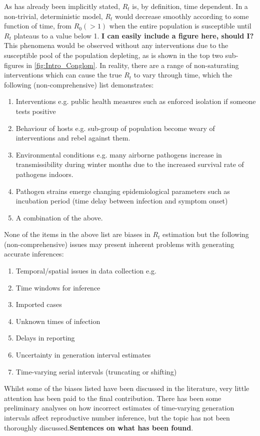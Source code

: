 \documentclass[10pt,journal,compsoc]{IEEEtran}
\begin{document}
As has already been implicitly stated, $R_t$ is, by definition, time dependent. In a non-trivial, deterministic model, $R_t$ would decrease smoothly according to some function of time, from $R_0(>1)$ when the entire population is susceptible until $R_t$ plateaus to a value below 1. \textbf{I can easily include a figure here, should I?} This phenomena would be observed without any interventions due to the susceptible pool of the population depleting, as is shown in the top two sub-figures in \ref{fig:Intro_Conglom}. In reality, there are a range of non-saturating interventions which can cause the true $R_t$ to vary through time, which the following (non-comprehensive) list demonstrates:
\begin{enumerate}
    \item Interventions e.g. public health measures such as enforced isolation if someone tests positive
    \item Behaviour of hosts e.g. sub-group of population become weary of interventions and rebel against them.
    \item Environmental conditions e.g. many airborne pathogens increase in transmissibility during winter months due to the increased survival rate of pathogens indoors.
    \item Pathogen strains emerge changing epidemiological parameters such as incubation period (time delay between infection and symptom onset)
    \item A combination of the above.
\end{enumerate}
None of the items in the above list are biases in $R_t$ estimation but the following (non-comprehensive) issues may present inherent problems with generating accurate inferences:
\begin{enumerate}
    \item Temporal/spatial issues in data collection e.g.
    \item Time windows for inference
    \item Imported cases
    \item Unknown times of infection
    \item Delays in reporting
    \item Uncertainty in generation interval estimates
    \item Time-varying serial intervals (truncating or shifting)
\end{enumerate}

Whilst some of the biases listed have been discussed in the literature, very little attention has been paid to the final contribution. There has been some preliminary analyses on how incorrect estimates of time-varying generation intervals affect reproductive number inference, but the topic has not been thoroughly discussed.\textbf{Sentences on what has been found}.
\end{document}
